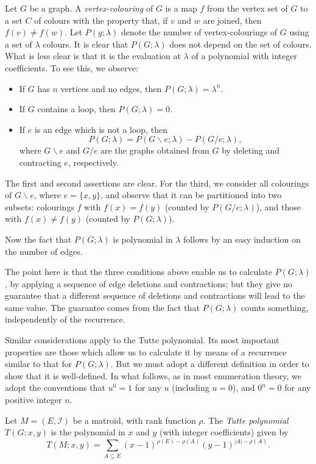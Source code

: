 \documentclass[12pt]{article}
\begin{document}
Let $G$ be a graph. A \emph{vertex-colouring} of $G$ is a map $f$
from the vertex set of $G$ to a set $C$ of colours with the
property that, if $v$ and $w$ are joined, then $f(v)\not=f(w)$.
Let $P(g;\lambda)$ denote the number of vertex-colourings of $G$
using a set of $\lambda$ colours. It is clear that $P(G;\lambda)$
does not depend on the set of colours. What is less clear is that
it is the evaluation at $\lambda$ of a polynomial with integer
coefficients. To see this, we observe:
\begin{itemize}
\item If $G$ has $n$ vertices and no edges, then $P(G;\lambda)=\lambda^n$.
\item If $G$ contains a loop, then $P(G;\lambda)=0$.
\item If $e$ is an edge which is not a loop, then
\[P(G;\lambda)=P(G\backslash e;\lambda)-P(G/e;\lambda),\]
where $G\backslash e$ and $G/e$ are the graphs obtained from $G$
by deleting and contracting $e$, respectively.
\end{itemize}
The first and second assertions are clear. For the third, we
consider all colourings of $G\backslash e$, where $e=\{x,y\}$, 
and observe that it can be partitioned into two subsets:
colourings $f$ with $f(x)=f(y)$ (counted by $P(G/e;\lambda)$),
and those with $f(x)\not=f(y)$ (counted by $P(G;\lambda)$).

Now the fact that $P(G;\lambda)$ is polynomial in $\lambda$
follows by an easy induction on the number of edges.

The point here is that the three conditions above enable us to calculate
$P(G;\lambda)$, by applying a sequence of edge deletions and contractions;
but they give no guarantee that a different sequence of deletions
and contractions will lead to the same value. The guarantee comes
from the fact that $P(G;\lambda)$ counts something, independently
of the recurrence.

Similar considerations apply to the Tutte polynomial. Its most
important properties are those which allow us to calculate it
by means of a recurrence similar to that for $P(G;\lambda)$. But
we must adopt a different definition in order to show that it is
well-defined. In what follows, as in most enumeration theory, we
adopt the conventions that $u^0=1$ for any $u$ (including $u=0$),
and $0^n=0$ for any positive integer $n$.

Let $M=(E,\mathcal{I})$ be a matroid, with rank function $\rho$.
The \emph{Tutte polynomial} $T(G;x,y)$ is the polynomial in $x$
and $y$ (with integer coefficients) given by
\[T(M;x,y)=\sum_{A\subseteq E}(x-1)^{\rho(E)-\rho(A)}(y-1)^{|A|-\rho(A)}.\]
\end{document}
